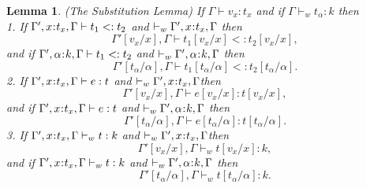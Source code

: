 \documentclass[11pt]{article}
\newtheorem{lemma}[theorem]{Lemma}
\newcommand{\al}{\alpha}
\newcommand{\bind}{\hspace{0.05em}{:}\hspace{0.05em}} %
\begin{document}
\begin{lemma}(The Substitution Lemma) 
If $\Gamma \vdash v_x : t_x$ and if $\Gamma \vdash_w t_\al : k$ then\\
1. If\; $\Gamma', x\bind t_x, \Gamma \vdash t_1 <: t_2$ and $\vdash_w \Gamma', x\bind t_x, \Gamma$ then
\[
\Gamma'[v_x/x], \Gamma \vdash t_1[v_x/x] <: t_2[v_x/x],
\]
and if\; $\Gamma', \al\bind k, \Gamma \vdash t_1 <: t_2$ and $\vdash_w \Gamma', \al\bind k, \Gamma$ then
\[
\Gamma'[t_\al/\al], \Gamma \vdash t_1[t_\al/\al] <: t_2[t_\al/\al].
\]
2. If\; $\Gamma', x\bind t_x, \Gamma \vdash e : t$ and $\vdash_w \Gamma', x\bind t_x, \Gamma$then
\[
\Gamma'[v_x/x], \Gamma \vdash e[v_x/x] : t[v_x/x],
\]
and if\; $\Gamma', x\bind t_x, \Gamma \vdash e : t$ and $\vdash_w \Gamma', \al\bind k, \Gamma$ then
\[
\Gamma'[t_\al/\al], \Gamma \vdash e[t_\al/\al] : t[t_\al/\al].
\]
3. If\; $\Gamma', x\bind t_x, \Gamma \vdash_w t : k$ and $\vdash_w \Gamma', x\bind t_x, \Gamma$then
\[
\Gamma'[v_x/x], \Gamma \vdash_w t[v_x/x] : k,
\]
and if\; $\Gamma', x\bind t_x, \Gamma \vdash_w t : k$ and $\vdash_w \Gamma', \al\bind k, \Gamma$ then
\[
\Gamma'[t_\al/\al], \Gamma \vdash_w t[t_\al/\al] : k.
\]
\end{lemma}
\end{document}
